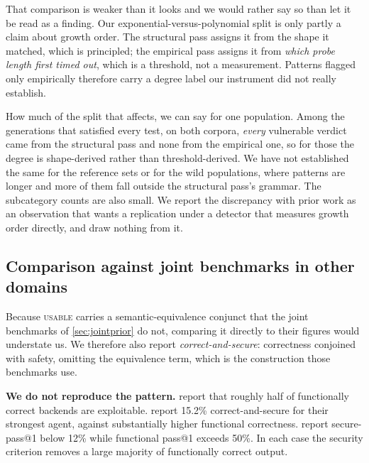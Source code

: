 \documentclass[11pt]{article}
\newcommand{\usable}{\textsc{usable}}
\begin{document}
That comparison is weaker than it looks and we would rather say so than let it
be read as a finding. Our exponential-versus-polynomial split is only partly a
claim about growth order. The structural pass assigns it from the shape it
matched, which is principled; the empirical pass assigns it from \emph{which
probe length first timed out}, which is a threshold, not a measurement.
Patterns flagged only empirically therefore carry a degree label our
instrument did not really establish.

How much of the split that affects, we can say for one population. Among the
generations that satisfied every test, on both corpora, \emph{every} vulnerable
verdict came from the structural pass and none from the empirical one, so for
those the degree is shape-derived rather than threshold-derived. We have not
established the same for the reference sets or for the wild populations, where
patterns are longer and more of them fall outside the structural pass's
grammar. The subcategory counts are also small. We report the discrepancy with
prior work as an observation that wants a replication under a detector that
measures growth order directly, and draw nothing from it.

\subsection{Comparison against joint benchmarks in other domains}
\label{sec:crossbench}

Because \usable{} carries a semantic-equivalence conjunct that the joint
benchmarks of \cref{sec:jointprior} do not, comparing it directly to their
figures would understate us. We therefore also report
\emph{correct-and-secure}: correctness conjoined with safety, omitting the
equivalence term, which is the construction those benchmarks use.

\begin{table}[htbp]
\centering
\footnotesize
\setlength{\tabcolsep}{4pt}

\caption{Our correct-and-secure rate against joint correctness-security
results from other domains. Task types, vulnerability classes and evaluation
methods all differ substantially. The comparison is one of magnitude and of
the ratio between functional and joint success, not of models or difficulty.}
\label{tab:crossbench}
\end{table}

\textbf{We do not reproduce the pattern.} \citet{vero2025baxbench} report that roughly half of functionally correct
backends are exploitable. \citet{chen2025secureagentbench} report 15.2\%
correct-and-secure for their strongest agent, against substantially higher
functional correctness. \citet{patir2025dualgauge} report secure-pass@1 below
12\% while functional pass@1 exceeds 50\%. In each case the security criterion removes a large
majority of functionally correct output.
\end{document}
